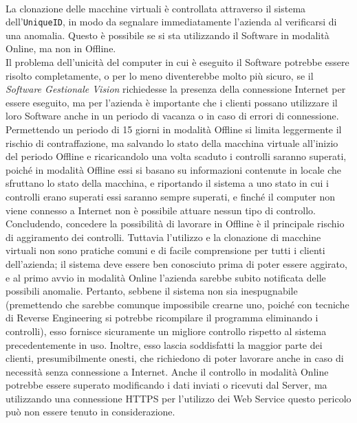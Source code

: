\\
La clonazione delle macchine virtuali è controllata attraverso il sistema dell'\texttt{UniqueID}, in modo da segnalare immediatamente l'azienda al verificarsi di una anomalia. Questo è possibile se si sta utilizzando il Software in modalità Online, ma non in Offline.
\\
Il problema dell'unicità del computer in cui è eseguito il Software potrebbe essere risolto completamente, o per lo meno diventerebbe molto più sicuro, se il \textit{Software Gestionale Vision} richiedesse la presenza della connessione Internet per essere eseguito, ma per l'azienda è importante che i clienti possano utilizzare il loro Software anche in un periodo di vacanza o in caso di errori di connessione. Permettendo un periodo di 15 giorni in modalità Offline si limita leggermente il rischio di contraffazione, ma salvando lo stato della macchina virtuale all'inizio del periodo Offline e ricaricandolo una volta scaduto i controlli saranno superati, poiché in modalità Offline essi si basano su informazioni contenute in locale che sfruttano lo stato della macchina, e riportando il sistema a uno stato in cui i controlli erano superati essi saranno sempre superati, e finché il computer non viene connesso a Internet non è possibile attuare nessun tipo di controllo.
\\Concludendo, concedere la possibilità di lavorare in Offline è il principale rischio di aggiramento dei controlli. Tuttavia l'utilizzo e la clonazione di macchine virtuali non sono pratiche comuni e di facile comprensione per tutti i clienti dell'azienda; il sistema deve essere ben conosciuto prima di poter essere aggirato, e al primo avvio in modalità Online l'azienda sarebbe subito notificata delle possibili anomalie. Pertanto, sebbene il sistema non sia inespugnabile (premettendo che sarebbe comunque impossibile crearne uno, poiché con tecniche di \gls{Reverse Engineering} si potrebbe ricompilare il programma eliminando i controlli), esso fornisce sicuramente un migliore controllo rispetto al sistema precedentemente in uso. Inoltre, esso lascia soddisfatti la maggior parte dei clienti, presumibilmente onesti, che richiedono di poter lavorare anche in caso di necessità senza connessione a Internet. Anche il controllo in modalità Online potrebbe essere superato modificando i dati inviati o ricevuti dal Server, ma utilizzando una connessione HTTPS per l'utilizzo dei Web Service questo pericolo può non essere tenuto in considerazione.